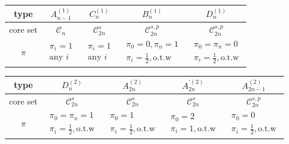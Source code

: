 \documentclass[pdftex]{sigma}
\numberwithin{equation}{section}
\begin{document}
\begin{center}\renewcommand{\arraystretch}{1.32}
\begin{tabular}{|c|c|c|c|c|}
\hline
type & $A_{n-1}^{(1)}$ & $C_{n}^{(1)}$ & $B_{n}^{(1)}$ & $D_{n}^{(1)}$ \\
\hline
core set & $\mathcal{C}_{n}$ & $\mathcal{C}_{2n}^{s}$ & $\mathcal{C}%
_{2n}^{s,p}$ & $\mathcal{C}_{2n}^{s,p}$ \\ \hline
$\pi $ & $%
\begin{array}{c}
\pi _{i}=1 \\
\text{any }i%
\end{array}%
$ & $%
\begin{array}{c}
\pi _{i}=1 \\
\text{any }i%
\end{array}%
$ & $%
\begin{array}{c}
\pi _{0}=0,\pi _{n}=1 \\
\pi _{i}=\frac{1}{2},\text{o.t.w}%
\end{array}%
$ & $%
\begin{array}{c}
\pi _{0}=\pi _{n}=0 \\
\pi _{i}=\frac{1}{2},\text{o.t.w}%
\end{array}%
$ \\ \hline
\end{tabular}
\vspace{2mm}

\begin{tabular}{|c|c|c|c|c|}
\hline
type & $D_{n}^{(2)}$ & $A_{2n}^{(2)}$ & $A_{2n}^{\prime (2)}$ & $%
A_{2n-1}^{(2)}$ \\ \hline
core set & $\mathcal{C}_{2n}^{s}$ & $\mathcal{C}_{2n}^{s}$ & $\mathcal{C}%
_{2n}^{s}$ & $\mathcal{C}_{2n}^{s,p}$ \\ \hline
$\pi $ & $%
\begin{array}{c}
\pi _{0}=\pi _{n}=1 \\
\pi _{i}=\frac{1}{2},\text{o.t.w}%
\end{array}%
$ & $%
\begin{array}{c}
\pi _{0}=1 \\
\pi _{i}=\frac{1}{2},\text{o.t.w}%
\end{array}%
$ & $%
\begin{array}{c}
\pi _{0}=2 \\
\pi _{i}=1,\text{o.t.w}%
\end{array}%
$ & $%
\begin{array}{c}
\pi _{0}=0 \\
\pi _{i}=\frac{1}{2},\text{o.t.w}%
\end{array}%
$ \\ \hline
\end{tabular}
\end{center}
\end{document}
